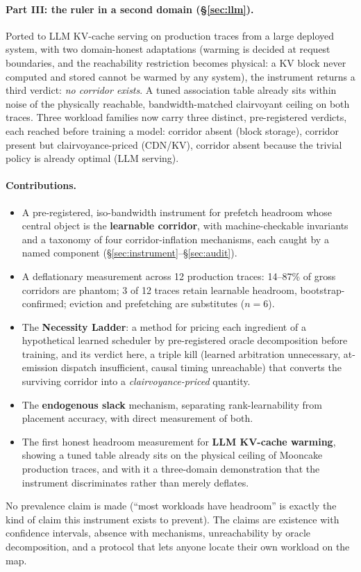 \documentclass[11pt]{article}
\begin{document}
\paragraph{Part III: the ruler in a second domain (\S\ref{sec:llm}).} Ported to LLM KV-cache serving on production traces from a large deployed system, with two domain-honest adaptations (warming is decided at request boundaries, and the reachability restriction becomes physical: a KV block never computed and stored cannot be warmed by any system), the instrument returns a third verdict: \emph{no corridor exists}. A tuned association table already sits within noise of the physically reachable, bandwidth-matched clairvoyant ceiling on both traces. Three workload families now carry three distinct, pre-registered verdicts, each reached before training a model: corridor absent (block storage), corridor present but clairvoyance-priced (CDN/KV), corridor absent because the trivial policy is already optimal (LLM serving).

\paragraph{Contributions.}
\begin{itemize}\itemsep0.1em
\item A pre-registered, iso-bandwidth instrument for prefetch headroom whose central object is the \textbf{learnable corridor}, with machine-checkable invariants and a taxonomy of four corridor-inflation mechanisms, each caught by a named component (\S\ref{sec:instrument}--\S\ref{sec:audit}).
\item A deflationary measurement across 12 production traces: 14--87\% of gross corridors are phantom; 3 of 12 traces retain learnable headroom, bootstrap-confirmed; eviction and prefetching are substitutes ($n{=}6$).
\item The \textbf{Necessity Ladder}: a method for pricing each ingredient of a hypothetical learned scheduler by pre-registered oracle decomposition before training, and its verdict here, a triple kill (learned arbitration unnecessary, at-emission dispatch insufficient, causal timing unreachable) that converts the surviving corridor into a \emph{clairvoyance-priced} quantity.
\item The \textbf{endogenous slack} mechanism, separating rank-learnability from placement accuracy, with direct measurement of both.
\item The first honest headroom measurement for \textbf{LLM KV-cache warming}, showing a tuned table already sits on the physical ceiling of Mooncake production traces, and with it a three-domain demonstration that the instrument discriminates rather than merely deflates.
\end{itemize}
No prevalence claim is made (``most workloads have headroom'' is exactly the kind of claim this instrument exists to prevent). The claims are existence with confidence intervals, absence with mechanisms, unreachability by oracle decomposition, and a protocol that lets anyone locate their own workload on the map.
\end{document}
